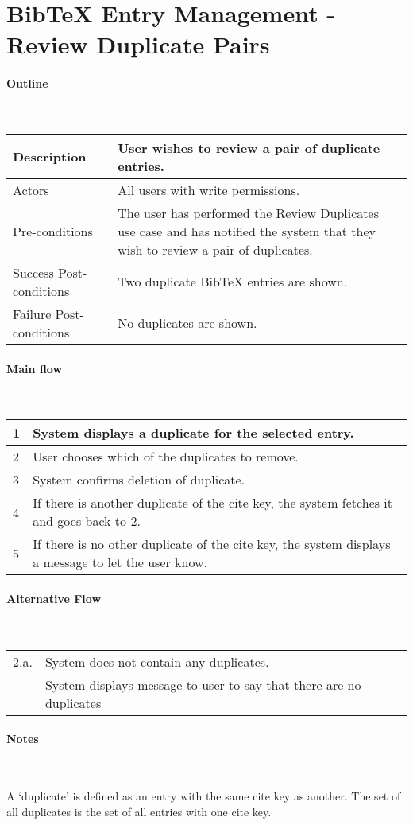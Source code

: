 \section*{BibTeX Entry Management - Review Duplicate Pairs} %

\paragraph*{Outline} \

\begin{tabular}{ | l | l | }
\hline
Description & User wishes to review a pair of duplicate entries. \\ \hline
Actors & All users with write permissions. \\ \hline
Pre-conditions & The user has performed the Review Duplicates use case and has notified the system that they wish to review a pair of duplicates. \\ \hline
Success Post-conditions & Two duplicate BibTeX entries are shown. \\ \hline
Failure Post-conditions & No duplicates are shown. \\ \hline
\end{tabular}


\paragraph*{Main flow} \

\begin{tabular}{ | l | l | } \hline
1 & System displays a duplicate for the selected entry. \\ \hline
2 & User chooses which of the duplicates to remove. \\ \hline
3 & System confirms deletion of duplicate. \\ \hline
4 & If there is another duplicate of the cite key, the system fetches it and goes back to 2. \\ \hline
5 & If there is no other duplicate of the cite key, the system displays a message to let the user know. \\ \hline
\end{tabular}


\paragraph*{Alternative Flow} \

\begin{tabular}{ | l | l | } \hline
2.a. & System does not contain any duplicates. \\
     & System displays message to user to say that there are no duplicates \\ \hline
\end{tabular}

\paragraph*{Notes} \

A `duplicate' is defined as an entry with the same cite key as another. The set of all duplicates is the set of all entries with one cite key.

